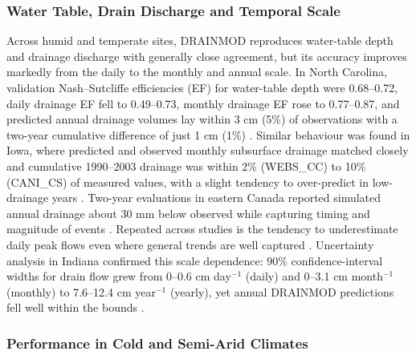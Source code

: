 \subsubsection{Water Table, Drain Discharge and Temporal Scale}

Across humid and temperate sites, \textsc{DRAINMOD} reproduces water-table depth and drainage discharge with generally close agreement, but its accuracy improves markedly from the daily to the monthly and annual scale. In North Carolina, validation Nash--Sutcliffe efficiencies (EF) for water-table depth were 0.68--0.72, daily drainage EF fell to 0.49--0.73, monthly drainage EF rose to 0.77--0.87, and predicted annual drainage volumes lay within 3 cm (5\%) of observations with a two-year cumulative difference of just 1 cm (1\%) \parencite{Gowda2012}. Similar behaviour was found in Iowa, where predicted and observed monthly subsurface drainage matched closely and cumulative 1990--2003 drainage was within 2\% (WEBS\_CC) to 10\% (CANI\_CS) of measured values, with a slight tendency to over-predict in low-drainage years \parencite{Singh2006b}. Two-year evaluations in eastern Canada reported simulated annual drainage about 30 mm below observed while capturing timing and magnitude of events \parencite{Dayyani2009}. Repeated across studies is the tendency to underestimate daily peak flows even where general trends are well captured \parencite{Morrison2014,Singh1996}. Uncertainty analysis in Indiana confirmed this scale dependence: 90\% confidence-interval widths for drain flow grew from 0--0.6 cm day$^{-1}$ (daily) and 0--3.1 cm month$^{-1}$ (monthly) to 7.6--12.4 cm year$^{-1}$ (yearly), yet annual DRAINMOD predictions fell well within the bounds \parencite{Wang2006}.

\subsubsection{Performance in Cold and Semi-Arid Climates}

